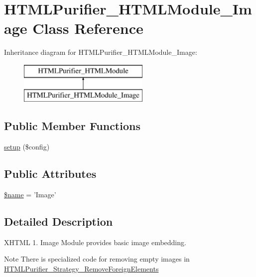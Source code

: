 \hypertarget{classHTMLPurifier__HTMLModule__Image}{\section{H\+T\+M\+L\+Purifier\+\_\+\+H\+T\+M\+L\+Module\+\_\+\+Image Class Reference}
\label{classHTMLPurifier__HTMLModule__Image}
}
Inheritance diagram for H\+T\+M\+L\+Purifier\+\_\+\+H\+T\+M\+L\+Module\+\_\+\+Image\+:\begin{figure}[H]
\begin{center}
\leavevmode
\includegraphics[height=2.000000cm]{classHTMLPurifier__HTMLModule__Image}
\end{center}
\end{figure}
\subsection*{Public Member Functions}
\begin{DoxyCompactItemize}
\item 
\hyperlink{classHTMLPurifier__HTMLModule__Image_a3d38cd4305afd0e1bd2b8d6e3daa22bb}{setup} (\$config)
\end{DoxyCompactItemize}
\subsection*{Public Attributes}
\begin{DoxyCompactItemize}
\item 
\hyperlink{classHTMLPurifier__HTMLModule__Image_ae861c8ed867d1dd559c9992cc5572364}{\$name} = 'Image'
\end{DoxyCompactItemize}


\subsection{Detailed Description}
X\+H\+T\+M\+L 1. Image Module provides basic image embedding. \begin{DoxyNote}{Note}
There is specialized code for removing empty images in \hyperlink{classHTMLPurifier__Strategy__RemoveForeignElements}{H\+T\+M\+L\+Purifier\+\_\+\+Strategy\+\_\+\+Remove\+Foreign\+Elements} 
\end{DoxyNote}


